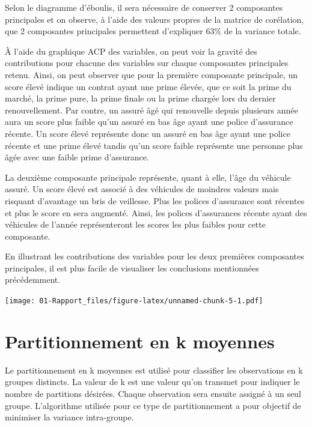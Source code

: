 \documentclass[
]{article}
\begin{document}
Selon le diagramme d'éboulis, il sera nécessaire de conserver 2
composantes principales et on observe, à l'aide des valeurs propres de
la matrice de corélation, que 2 composantes principales permettent
d'expliquer 63\% de la variance totale.

À l'aide du graphique ACP des variables, on peut voir la gravité des
contributions pour chacune des variables sur chaque composantes
principales retenu. Ainsi, on peut observer que pour la première
composante principale, un score élevé indique un contrat ayant une prime
élevée, que ce soit la prime du marché, la prime pure, la prime finale
ou la prime chargée lors du dernier renouvellement. Par contre, un
assuré âgé qui renouvelle depuis plusieurs année aura un score plus
faible qu'un assuré en bas âge ayant une police d'assurance récente. Un
score élevé représente donc un assuré en bas âge ayant une police
récente et une prime élevé tandis qu'un score faible représente une
personne plus âgée avec une faible prime d'assurance.

La deuxième composante principale représente, quant à elle, l'âge du
véhicule assuré. Un score élevé est associé à des véhicules de moindres
valeurs mais risquant d'avantage un bris de veillesse. Plus les polices
d'assurance sont récentes et plus le score en sera augmenté. Ainsi, les
polices d'assurances récente ayant des véhicules de l'année
représenteront les scores les plus faibles pour cette composante.

En illustrant les contributions des variables pour les deux premières
composantes principales, il est plus facile de visualiser les
conclusions mentionnées précédemment.

\texttt{[image: 01-Rapport\_files/figure-latex/unnamed-chunk-5-1.pdf]}

\newpage

\hypertarget{partitionnement-en-k-moyennes}{%
\section{Partitionnement en k
moyennes}\label{partitionnement-en-k-moyennes}}

Le partitionnement en k moyennes est utilisé pour classifier les
observations en k groupes distincts. La valeur de k est une valeur qu'on
transmet pour indiquer le nombre de partitions désirées. Chaque
observation sera ensuite assigné à un seul groupe. L'algorithme utilisée
pour ce type de partitionnement a pour objectif de minimiser la variance
intra-groupe.
\end{document}
